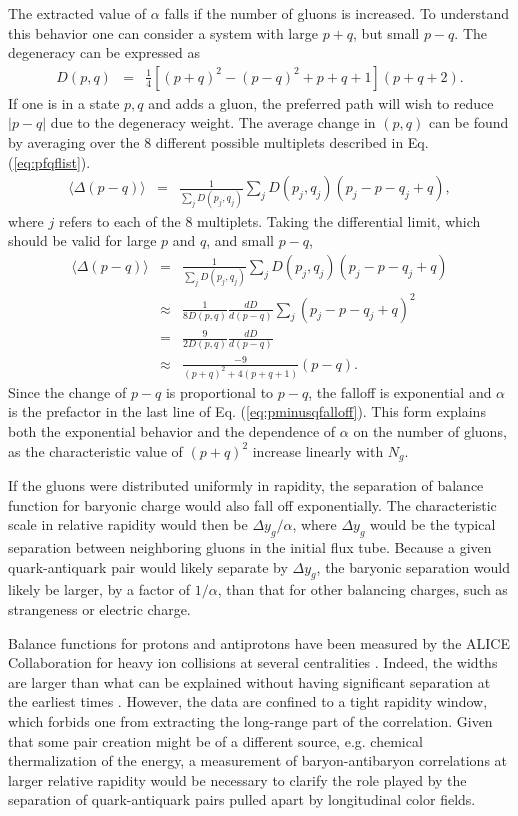 \documentclass[aps, prc, 12pt, nofootinbib, showpacs, superscriptaddress, tightenlines, groupedaddress]{revtex4-2}
\begin{document}
The extracted value of $\alpha$ falls if the number of gluons is increased. To understand this behavior one can consider a system with large $p+q$, but small $p-q$. The degeneracy can be expressed as
\begin{eqnarray}
D(p,q)&=&\frac{1}{4}\left[(p+q)^2-(p-q)^2+p+q+1\right](p+q+2).
\end{eqnarray}
If one is in a state $p,q$ and adds a gluon, the preferred path will wish to reduce $|p-q|$ due to the degeneracy weight. The average change in $(p,q)$ can be found by averaging over the 8 different possible multiplets described in Eq. (\ref{eq:pfqflist}). 
\begin{eqnarray}
\langle \Delta(p-q)\rangle &=&\frac{1}{\sum_jD(p_j,q_j)}\sum_jD(p_j,q_j)(p_j-p-q_j+q),
\end{eqnarray}
where $j$ refers to each of the 8 multiplets. Taking the differential limit, which should be valid for large $p$ and $q$, and small $p-q$, 
\begin{eqnarray}\label{eq:pminusqfalloff}
\langle \Delta(p-q)\rangle &=&\frac{1}{\sum_jD(p_j,q_j)}\sum_jD(p_j,q_j)(p_j-p-q_j+q)\\
\nonumber
&\approx&\frac{1}{8D(p,q)}\frac{dD}{d(p-q)}\sum_j (p_j-p-q_j+q)^2\\
\nonumber
&=&\frac{9}{2D(p,q)}\frac{dD}{d(p-q)}\\
\nonumber
&\approx&\frac{-9}{(p+q)^2+4(p+q+1)}(p-q).
\end{eqnarray}
Since the change of $p-q$ is proportional to $p-q$, the falloff is exponential and $\alpha$ is the prefactor in the last line of Eq. (\ref{eq:pminusqfalloff}). This form explains both the exponential behavior and the dependence of $\alpha$ on the number of gluons, as the characteristic value of $(p+q)^2$ increase linearly with $N_g$.

If the gluons were distributed uniformly in rapidity, the separation of balance function for baryonic charge would also fall off exponentially. The characteristic scale in relative rapidity would then be $\Delta y_g/\alpha$, where $\Delta y_g$ would be the typical separation between neighboring gluons in the initial flux tube. Because a given quark-antiquark pair would likely separate by $\Delta y_g$, the baryonic separation would likely be larger, by a factor of $1/\alpha$, than that for other balancing charges, such as strangeness or electric charge.

Balance functions for protons and antiprotons have been measured by the ALICE Collaboration for heavy ion collisions at several centralities \cite{ALICE:2021hjb}. Indeed, the widths are larger than what can be explained without having significant separation at the earliest times \cite{Pratt:2021xvg}. However, the data are confined to a tight rapidity window, which forbids one from extracting the long-range part of the correlation. Given that some pair creation might be of a different source, e.g. chemical thermalization of the energy, a measurement of baryon-antibaryon correlations at larger relative rapidity would be necessary to clarify the role played by the separation of quark-antiquark pairs pulled apart by longitudinal color fields. 
\end{document}
